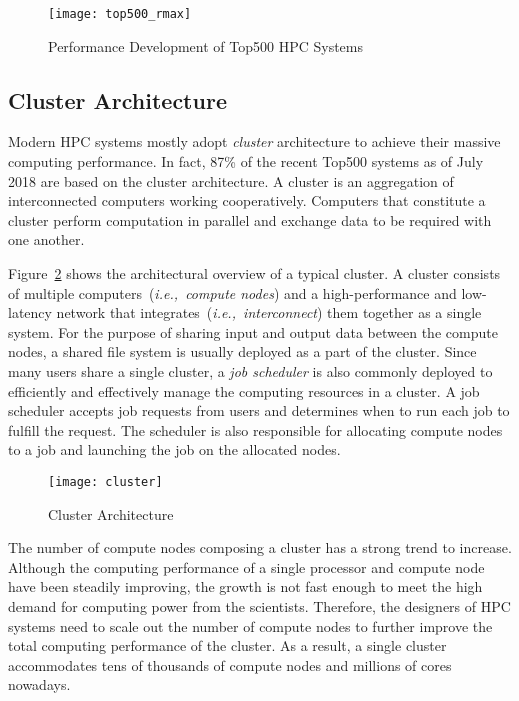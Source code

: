 \begin{figure}
    \centering
    \texttt{[image: top500\_rmax]}
    \caption{Performance Development of Top500 HPC Systems~\autocite{top500}}%
    \label{fig:top500-rmax}
\end{figure}

\subsection{Cluster Architecture}\label{i:cluster-arch}

Modern HPC systems mostly adopt \emph{cluster} architecture to achieve their
massive computing performance. In fact, 87\% of the recent Top500 systems
as of July 2018 are based on the cluster architecture. A cluster is an
aggregation of interconnected computers working cooperatively. Computers that
constitute a cluster perform computation in parallel and exchange data to be
required with one another.

Figure~\ref{fig:cluster} shows the architectural overview of a typical
cluster. A cluster consists of multiple computers~(\emph{i.e.,\ compute
nodes}) and a high-performance and low-latency network that
integrates~(\emph{i.e.,\ interconnect}) them together as a single system.
For the purpose of sharing input and output data between the compute nodes, a
shared file system is usually deployed as a part of the cluster. Since many
users share a single cluster, a \emph{job scheduler} is also commonly deployed to
efficiently and effectively manage the computing resources in a cluster. A job
scheduler accepts job requests from users and determines when to run each job
to fulfill the request. The scheduler is also responsible for allocating
compute nodes to a job and launching the job on the allocated nodes.

\begin{figure}
    \centering
    \texttt{[image: cluster]}
    \caption{Cluster Architecture}%
    \label{fig:cluster}
\end{figure}

The number of compute nodes composing a cluster has a strong trend to
increase. Although the computing performance of a single processor and compute
node have been steadily improving, the growth is not fast enough to meet the
high demand for computing power from the scientists. Therefore, the designers
of HPC systems need to scale out the number of compute nodes to further
improve the total computing performance of the cluster. As a result, a single
cluster accommodates tens of thousands of compute nodes and millions of cores
nowadays.

